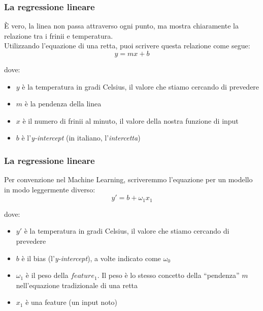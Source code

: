 \begin{frame}

	\frametitle{La regressione lineare}

	\begin{block}{}
		È vero, la linea non passa attraverso ogni punto, ma mostra chiaramente  la relazione tra i frinii e temperatura.\\
		Utilizzando l'equazione di una retta, puoi scrivere questa relazione come segue:
		$$y = mx + b$$

		dove:

		\begin{itemize}
			\item $y$ è la temperatura in gradi Celsius, il valore che stiamo cercando di prevedere
			\item $m$ è la pendenza della linea
			\item $x$ è il numero di frinii al minuto, il valore della nostra funzione di input
			\item $b$ è l'\textit{y-intercept} (in italiano, l'\textit{intercetta})
		\end{itemize}
	\end{block}

\end{frame}


\begin{frame}

	\frametitle{La regressione lineare}

	\begin{block}{}
		Per convenzione nel Machine Learning, scriveremmo l'equazione per un modello in modo leggermente diverso:
		$$y' = b + \omega_1x_1$$

		dove:

		\begin{itemize}
			\item $y'$ è la temperatura in gradi Celsius, il valore che stiamo cercando di prevedere
			\item $b$ è il bias (l'\textit{y-intercept}), a volte indicato come $\omega_0$
			\item $\omega_1$ è il peso della $feature_1$. Il peso è lo stesso concetto della ``pendenza'' $m$ nell'equazione tradizionale di una retta
			\item $x_1$ è una feature (un input noto)
		\end{itemize}
	\end{block}

\end{frame}



